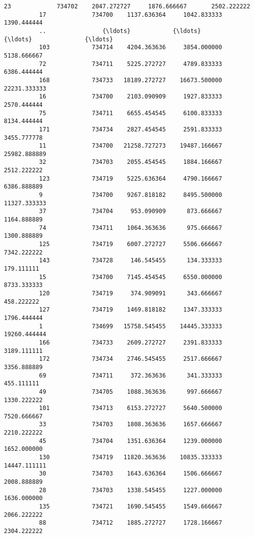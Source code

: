 \documentclass[11pt]{article}
\begin{document}
\begin{Verbatim}[commandchars=\\\{\}]
          23             734702    2047.272727     1876.666667       2502.222222   
          17             734700    1137.636364     1042.833333       1390.444444   
          ..                {\ldots}            {\ldots}             {\ldots}               {\ldots}   
          103            734714    4204.363636     3854.000000       5138.666667   
          72             734711    5225.272727     4789.833333       6386.444444   
          168            734733   18189.272727    16673.500000      22231.333333   
          16             734700    2103.090909     1927.833333       2570.444444   
          75             734711    6655.454545     6100.833333       8134.444444   
          171            734734    2827.454545     2591.833333       3455.777778   
          11             734700   21258.727273    19487.166667      25982.888889   
          32             734703    2055.454545     1884.166667       2512.222222   
          123            734719    5225.636364     4790.166667       6386.888889   
          9              734700    9267.818182     8495.500000      11327.333333   
          37             734704     953.090909      873.666667       1164.888889   
          74             734711    1064.363636      975.666667       1300.888889   
          125            734719    6007.272727     5506.666667       7342.222222   
          143            734728     146.545455      134.333333        179.111111   
          15             734700    7145.454545     6550.000000       8733.333333   
          120            734719     374.909091      343.666667        458.222222   
          127            734719    1469.818182     1347.333333       1796.444444   
          1              734699   15758.545455    14445.333333      19260.444444   
          166            734733    2609.272727     2391.833333       3189.111111   
          172            734734    2746.545455     2517.666667       3356.888889   
          69             734711     372.363636      341.333333        455.111111   
          49             734705    1088.363636      997.666667       1330.222222   
          101            734713    6153.272727     5640.500000       7520.666667   
          33             734703    1808.363636     1657.666667       2210.222222   
          45             734704    1351.636364     1239.000000       1652.000000   
          130            734719   11820.363636    10835.333333      14447.111111   
          30             734703    1643.636364     1506.666667       2008.888889   
          28             734703    1338.545455     1227.000000       1636.000000   
          135            734721    1690.545455     1549.666667       2066.222222   
          88             734712    1885.272727     1728.166667       2304.222222   
          

\end{Verbatim}
\end{document}
